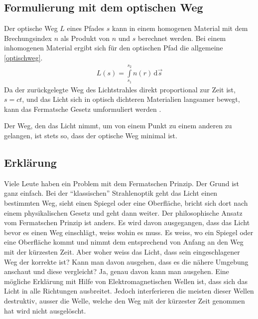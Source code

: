 \subsection{Formulierung mit dem optischen Weg}
Der optische Weg $L$  eines Pfades $s$ kann in einem homogenen Material 
mit dem Brechungsindex $n$ als Produkt von $n$ und $s$ berechnet werden.
Bei einem inhomogenen Material ergibt sich für den optischen Pfad die allgemeine \eqref{optischweg}.
\begin{align}
	L(s) = \int\limits_{s_1}^{s_2} n(r) \,\mathrm d\vec s 
	\label{optischweg}
\end{align}
Da der zurückgelegte Weg des Lichtstrahles direkt proportional zur Zeit ist, $s = c t$,
und das Licht sich in optisch dichteren Materialien langsamer bewegt,
kann das Fermatsche Gesetz umformuliert werden \cite{DefinitionFermat}. 
\begin{postulat}
Der Weg, den das Licht nimmt, um von einem Punkt zu einem anderen zu gelangen, ist stets so, dass der optische Weg minimal ist.
\end{postulat}
\subsection{Erklärung}
Viele Leute haben ein Problem mit dem Fermatschen Prinzip. 
Der Grund ist ganz einfach. 
Bei der ``klassischen'' Strahlenoptik geht das Licht einen bestimmten Weg, 
sieht einen Spiegel oder eine Oberfläche, bricht sich dort nach einem 
physikalischen Gesetz und geht dann weiter.
Der philosophische Ansatz vom Fermatschen Prinzip ist anders. 
Es wird davon ausgegangen, dass das Licht bevor es einen Weg einschlägt, 
weiss wohin es muss. Es weiss, wo ein Spiegel oder eine Oberfläche kommt und 
nimmt dem entsprechend von Anfang an den Weg mit der kürzesten Zeit.
Aber woher weiss das Licht, dass sein eingeschlagener Weg der korrekte ist?
Kann man davon ausgehen, dass es die nähere Umgebung anschaut und diese vergleicht?
Ja, genau davon kann man ausgehen. Eine mögliche Erklärung mit Hilfe von Elektromagnetischen Wellen ist,
dass sich das Licht in alle Richtungen ausbreitet. 
Jedoch interferieren die meisten dieser Wellen destruktiv, 
ausser die Welle, welche den Weg mit der kürzester Zeit genommen hat wird nicht ausgelöscht.